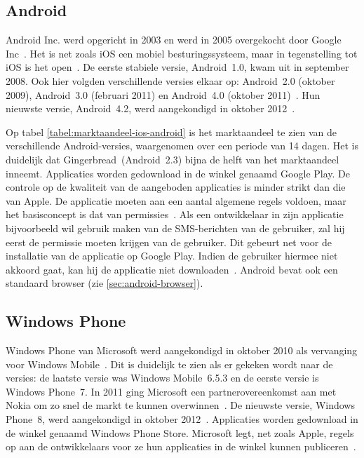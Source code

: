 \subsection{Android}
Android Inc. werd opgericht in 2003 en werd in 2005 overgekocht door Google Inc~\cite{Satyesh2012}. 
Het is net zoals iOS een mobiel besturingssysteem, maar in tegenstelling tot iOS is het open~\cite{David2011}. 
De eerste stabiele versie, Android~1.0, kwam uit in september 2008. 
Ook hier volgden verschillende versies elkaar op: Android~2.0 (oktober 2009), Android~3.0 (februari 2011) en Android~4.0 (oktober 2011)~\cite{Satyesh2012}. 
Hun nieuwste versie, Android~4.2, werd aangekondigd in oktober 2012~\cite{Sawers2012}. 

Op tabel \ref{tabel:marktaandeel-ios-android} is het marktaandeel te zien van de verschillende Android-versies, waargenomen over een periode van 14 dagen. 
Het is duidelijk dat Gingerbread~(Android~2.3) bijna de helft van het marktaandeel inneemt.
Applicaties worden gedownload in de winkel genaamd Google Play. 
De controle op de kwaliteit van de aangeboden applicaties is minder strikt dan die van Apple.
De applicatie moeten aan een aantal algemene regels voldoen, maar het basisconcept is dat van permissies~\cite{Android2013b}.
Als een ontwikkelaar in zijn applicatie bijvoorbeeld wil gebruik maken van de SMS-berichten van de gebruiker, zal hij eerst de permissie moeten krijgen van de gebruiker.
Dit gebeurt net voor de installatie van de applicatie op Google Play.
Indien de gebruiker hiermee niet akkoord gaat, kan hij de applicatie niet downloaden~\cite{Android2013a}.
Android bevat ook een standaard browser (zie \ref{sec:android-browser}).

\subsection{Windows Phone}
Windows Phone van Microsoft werd aangekondigd in oktober 2010 als vervanging voor Windows Mobile~\cite{Seitz2010,Lieberman2010}. 
Dit is duidelijk te zien als er gekeken wordt naar de versies: de laatste versie was Windows Mobile~6.5.3 en de eerste versie is Windows Phone~7. 
In 2011 ging Microsoft een partnerovereenkomst aan met Nokia om zo snel de markt te kunnen overwinnen~\cite{Microsoft2011}. 
De nieuwste versie, Windows Phone~8, werd aangekondigd in oktober 2012~\cite{Reed2012}. 
Applicaties worden gedownload in de winkel genaamd Windows Phone Store.
Microsoft legt, net zoals Apple, regels op aan de ontwikkelaars voor ze hun applicaties in de winkel kunnen publiceren~\cite{Microsoft2013a}.

